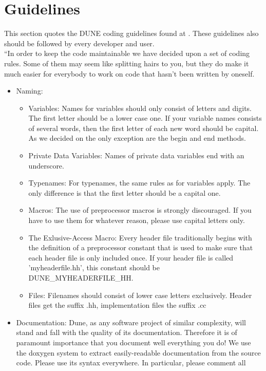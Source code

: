 \section{Guidelines} 
\label{guidelines}

This section quotes the DUNE coding guidelines found at \cite{DUNE-HP}. 
These guidelines also should be followed by every \Dumux developer and user. \\
``In order to keep the code maintainable we have decided upon a set of coding rules. 
Some of them may seem like splitting hairs to you, but they do make it much easier 
for everybody to work on code that hasn't been written by oneself.

\begin{itemize}
\item Naming: 
\begin{itemize}
\item Variables: Names for variables should only consist of letters and digits. The first letter should be a lower case one. If your variable names consists of several words, then the first letter of each new word should be capital. As we decided on the only exception are the begin and end methods.
\item Private Data Variables: Names of private data variables end with an underscore.
\item Typenames: For typenames, the same rules as for variables apply. The only difference is that the first letter should be a capital one.
\item Macros: The use of preprocessor macros is strongly discouraged. If you have to use them for whatever reason, please use capital letters only.
\item The Exlusive-Access Macro: Every header file traditionally begins with the definition of a preprocessor constant that is used to make sure that each header file is only included once. If your header file is called 'myheaderfile.hh', this constant should be DUNE\_MYHEADERFILE\_HH.
\item Files: Filenames should consist of lower case letters exclusively. Header files get the suffix .hh, implementation files the suffix .cc
\end{itemize}
\item Documentation:
      Dune, as any software project of similar complexity, will stand and fall with the quality of its documentation.
Therefore it is of paramount importance that you document well everything you do! We use the doxygen system to extract easily-readable documentation from the source code. Please use its syntax everywhere. In particular, please comment all

\end{itemize}
